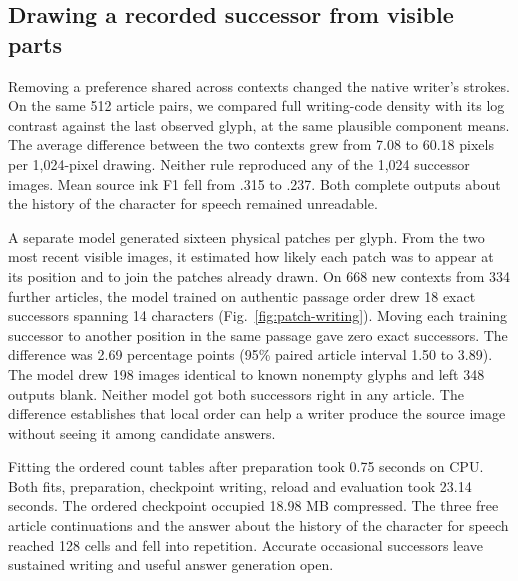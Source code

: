 \subsection*{Drawing a recorded successor from visible parts}
Removing a preference shared across contexts changed the native writer's
strokes. On the same 512 article pairs, we compared full writing-code density
with its log contrast against the last observed glyph, at the same plausible
component means. The average difference between the two contexts grew from
7.08 to 60.18 pixels per 1,024-pixel drawing. Neither rule reproduced any of
the 1,024 successor images. Mean source ink F1 fell from .315 to .237.
Both complete outputs about the history of the character for speech remained
unreadable.

A separate model generated sixteen physical patches per glyph. From the two
most recent visible images, it estimated how likely each patch was to appear
at its position and to join the patches already drawn. On 668 new contexts
from 334 further articles, the model trained on authentic passage order drew
18 exact successors spanning 14 characters (Fig.~\ref{fig:patch-writing}).
Moving each training successor to another position in the same passage gave
zero exact successors. The difference was 2.69 percentage points (95\%
paired article interval 1.50 to 3.89). The model drew 198 images identical
to known nonempty glyphs and left 348 outputs blank. Neither model got both
successors right in any article. The difference establishes that local order
can help a writer produce the source image without seeing it among candidate
answers.

Fitting the ordered count tables after preparation took 0.75 seconds on CPU.
Both fits, preparation, checkpoint writing, reload and evaluation took 23.14
seconds. The ordered checkpoint occupied 18.98 MB compressed. The three free
article continuations and the answer about the history of the character for
speech reached 128 cells and fell into repetition. Accurate occasional
successors leave sustained writing and useful answer generation open.
